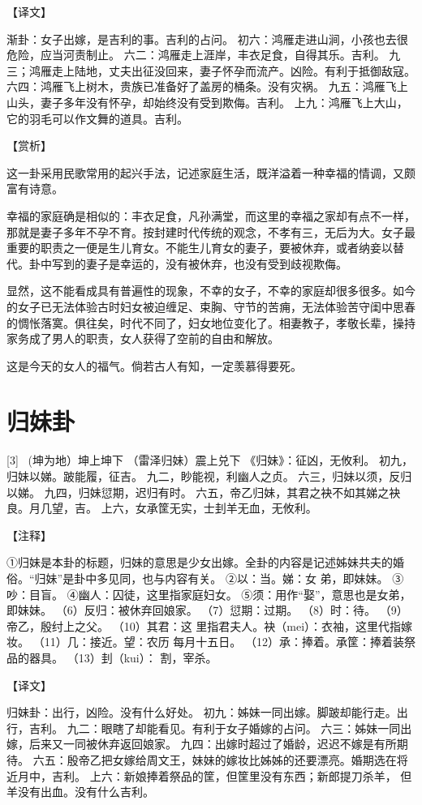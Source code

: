 \documentclass[12pt,UTF8]{ctexbook}
\begin{document}
【译文】

渐卦：女子出嫁，是吉利的事。吉利的占问。
初六：鸿雁走进山涧，小孩也去很危险，应当河责制止。
六二：鸿雁走上涯岸，丰衣足食，自得其乐。吉利。
九三；鸿雁走上陆地，丈夫出征没回来，妻子怀孕而流产。凶险。有利于抵御敌寇。
六四：鸿雁飞上树木，贵族已准备好了盖房的桶条。没有灾祸。
九五：鸿雁飞上山头，妻子多年没有怀孕，却始终没有受到欺侮。吉利。
上九：鸿雁飞上大山，它的羽毛可以作文舞的道具。吉利。

【赏析】

这一卦采用民歌常用的起兴手法，记述家庭生活，既洋溢着一种幸福的情调，又颇富有诗意。

幸福的家庭确是相似的：丰衣足食，凡孙满堂，而这里的幸福之家却有点不一样，那就是妻子多年不孕不育。按封建时代传统的观念，不孝有三，无后为大。女子最重要的职责之一便是生儿育女。不能生儿育女的妻子，要被休弃，或者纳妾以替代。卦中写到的妻子是幸运的，没有被休弃，也没有受到歧视欺侮。

显然，这不能看成具有普遍性的现象，不幸的女子，不幸的家庭却很多很多。如今的女子已无法体验古时妇女被迫缠足、束胸、守节的苦痈，无法体验苦守闺中思春的惆怅落寞。俱往矣，时代不同了，妇女地位变化了。相妻教子，孝敬长辈，操持家务成了男人的职责，女人获得了空前的自由和解放。

这是今天的女人的福气。倘若古人有知，一定羡慕得要死。

\chapter{归妹卦}
[3] \ (坤为地）坤上坤下
（雷泽归妹）震上兑下
《归妹》：征凶，无攸利。
初九，归妹以娣。跛能履，征吉。
九二，眇能视，利幽人之贞。
六三，归妹以须，反归以娣。
九四，归妹愆期，迟归有时。
六五，帝乙归妹，其君之袂不如其娣之袂良。月几望，吉。
上六，女承筐无实，士刲羊无血，无攸利。

【注释】

①归妹是本卦的标题，归妹的意思是少女出嫁。全卦的内容是记述姊妹共夫的婚俗。“归妹”是卦中多见同，也与内容有关。
②以：当。娣：女 弟，即妹妹。
③吵：目盲。
④幽人：囚徒，这里指家庭妇女。
⑤须：用作“娶”，意思也是女弟，即妹妹。
（6）反归：被休弃回娘家。
（7）愆期：过期。
（8）时：待。
（9）帝乙，殷纣上之父。
（10）其君：这 里指君夫人。袂（mei）：衣袖，这里代指嫁妆。
（11）几：接近。望：农历 每月十五日。
（12）承：捧着。承筐：捧着装祭品的器具。
（13）刲（kui）： 割，宰杀。

【译文】

归妹卦：出行，凶险。没有什么好处。
初九：姊妹一同出嫁。脚跛却能行走。出行，吉利。
九二：眼瞎了却能看见。有利于女子婚嫁的占问。
六三：姊妹一同出嫁，后来又一同被休弃返回娘家。
九四：出嫁时超过了婚龄，迟迟不嫁是有所期待。
六五：殷帝乙把女嫁给周文王，妹妹的嫁妆比姊姊的还要漂亮。婚期选在将近月中，吉利。
上六：新娘捧着祭品的筐，但筐里没有东西；新郎提刀杀羊， 但羊没有出血。没有什么吉利。
\end{document}
